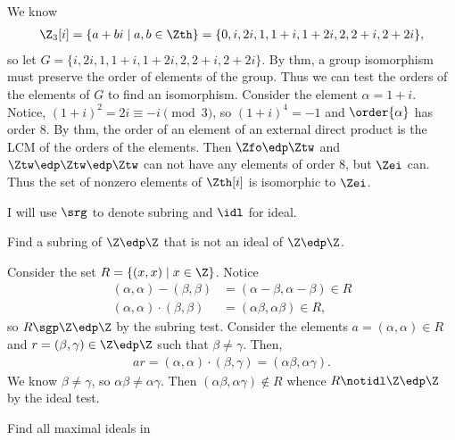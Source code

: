 \documentclass{article}
\begin{document}
\begin{solution} %
  We know \begin{align*}
    \Z_3[i] = \{a+bi \mid a,b\in\Zth\} = \{0, i, 2i, 1, 1+i, 1+2i, 2, 2+i, 2+2i\},
  \end{align*}
  so let \( G = \{i, 2i, 1, 1+i, 1+2i, 2, 2+i, 2+2i\} \).
  By thm, a group isomorphism must preserve the order of elements of the group.
  Thus we can test the orders of the elements of \( G \) to find an isomorphism.
  Consider the element \( \alpha=1+i \).
  Notice, \( (1+i)^2 = 2i \equiv -i \pmod 3 \), so \( (1+i)^4 = -1 \) and \( \order{\alpha} \) has order 8.
  By thm, the order of an element of an external direct product is the LCM of the orders of the elements.
  Then \( \Zfo\edp\Ztw \) and \( \Ztw\edp\Ztw\edp\Ztw \) can not have any elements of order 8, but \( \Zei \) can.
  Thus the set of nonzero elements of \( \Zth[i] \) is isomorphic to \( \Zei \).
\end{solution}

\begin{note}[Notation]
  I will use \( \srg \) to denote subring and \( \idl \) for ideal.
\end{note}

Find a subring of \( \Z\edp\Z \) that is not an ideal of \( \Z\edp\Z \).

\begin{solution} %
Consider the set \( R = \{(x,x)\mid x\in\Z\} \).
Notice \begin{align}
  (\alpha,\alpha) - (\beta,\beta) &= (\alpha-\beta, \alpha-\beta) \in R \label{srt c1}\\
  (\alpha,\alpha) \cdot (\beta,\beta) &= (\alpha\beta,\alpha\beta) \in R,
\end{align}
so \( R\sgp\Z\edp\Z \) by the subring test. Consider the elements \( a=(\alpha,\alpha)\in R \) and \( r = (\beta, \gamma) \in \Z\edp\Z \) such that \( \beta\neq\gamma \). Then, \begin{align*}
  ar = (\alpha,\alpha)\cdot (\beta,\gamma) = (\alpha\beta, \alpha\gamma).
\end{align*}
We know \( \beta\neq\gamma \), so \( \alpha\beta\neq\alpha\gamma \). Then \( (\alpha\beta,\alpha\gamma) \notin R \) whence \( R\notidl \Z\edp\Z \) by the ideal test.
\end{solution}

Find all maximal ideals in \\
\Zn
\end{document}
